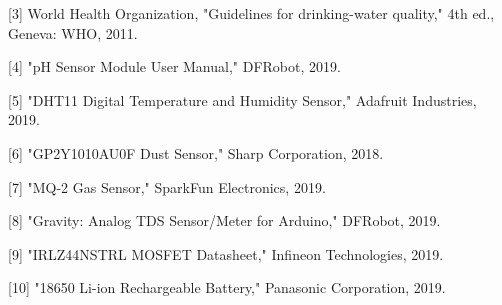 \documentclass[a4paper,11pt]{article}%
\begin{document}
[3] World Health Organization, "Guidelines for drinking-water quality," 4th ed., Geneva: WHO, 2011.

[4] "pH Sensor Module User Manual," DFRobot, 2019.

[5] "DHT11 Digital Temperature and Humidity Sensor," Adafruit Industries, 2019.

[6] "GP2Y1010AU0F Dust Sensor," Sharp Corporation, 2018.

[7] "MQ-2 Gas Sensor," SparkFun Electronics, 2019.

[8] "Gravity: Analog TDS Sensor/Meter for Arduino," DFRobot, 2019.

[9] "IRLZ44NSTRL MOSFET Datasheet," Infineon Technologies, 2019.

[10] "18650 Li-ion Rechargeable Battery," Panasonic Corporation, 2019.


\end{document}
